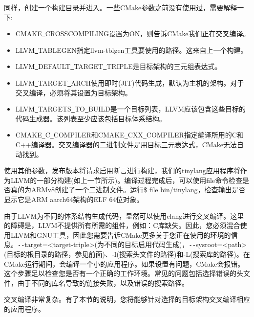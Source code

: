 同样，创建一个构建目录并进入。一些CMake参数之前没有使用过，需要解释一下:\par

\begin{itemize}
	\item CMAKE\underline{~}CROSSCOMPILING设置为ON，则告诉CMake我们正在交叉编译。
	\item LLVM\underline{~}TABLEGEN指定llvm-tblgen工具要使用的路径。这来自上一个构建。
	\item LLVM\underline{~}DEFAULT\underline{~}TARGET\underline{~}TRIPLE是目标架构的三元组表达式。
	\item LLVM\underline{~}TARGET\underline{~}ARCH使用即时(JIT)代码生成，默认为主机的架构。对于交叉编译，必须将其设置为目标架构。
	\item LLVM\underline{~}TARGETS\underline{~}TO\underline{~}BUILD是一个目标列表，LLVM应该包含这些目标的代码生成器。该列表至少应该包括目标体系结构。
	\item CMAKE\underline{~}C\underline{~}COMPILER和CMAKE\underline{~}CXX\underline{~}COMPILER指定编译所用的C和C++编译器。交叉编译器的二进制文件是用目标三元表达式，CMake无法自动找到。
\end{itemize}

使用其他参数，发布版本将请求启用断言进行构建，我们的tinylang应用程序将作为LLVM的一部分构建(如上一节所示)。编译过程完成后，可以使用file命令检查是否真的为ARMv8创建了一个二进制文件。运行\$ file bin/tinylang，检查输出是否显示它是ARM aarch64架构的ELF 64位对象。\par

\begin{tcolorbox}[colback=blue!5!white,colframe=blue!75!black, title=使用clang进行交叉编译]
由于LLVM为不同的体系结构生成代码，显然可以使用clang进行交叉编译。这里的障碍是，LLVM不提供所有所需的组件，例如：C库缺失。因此，您必须混合使用LLVM和GNU工具，因此您需要告诉CMake更多关于您正在使用的环境的信息。\verb|--|target=<target-triple>(为不同的目标启用代码生成)，\verb|--|sysroot=<path>(目标的根目录的路径，参见前面)、-I(搜索头文件的路径)和-L(搜索库的路径)。在CMake运行期间，会编译一个小的应用程序。如果设置有问题，CMake会报错。这个步骤足以检查您是否有一个正确的工作环境。常见的问题包括选择错误的头文件，由于不同的库名导致的链接失败，以及错误的搜索路径。
\end{tcolorbox}

交叉编译非常复杂。有了本节的说明，您将能够针对选择的目标架构交叉编译相应的应用程序。\par































